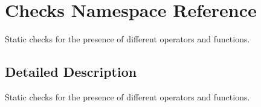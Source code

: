 \hypertarget{namespaceChecks}{\section{Checks Namespace Reference}
\label{namespaceChecks}
}


Static checks for the presence of different operators and functions.  




\subsection{Detailed Description}
Static checks for the presence of different operators and functions. 